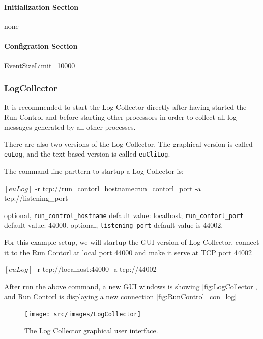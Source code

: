 \paragraph{Initialization Section}
none

\paragraph{Configration Section}
\begin{listing}[conf]
[RunControl]
EventSizeLimit=10000
\end{listing}

\subsubsection{LogCollector}
\label{sec:logcollector}
It is recommended to start the Log Collector directly after having started the Run Control and before starting other processors in order to collect all log messages generated by all other processes.

There are also two versions of the Log Collector.
The graphical version is called \texttt{euLog},
and the text-based version is called \texttt{euCliLog}.

The command line parttern to startup a Log Collector is:
\begin{listing}[mybash]
$[euLog]$ -r tcp://{run_contorl_hostname}:{run_contorl_port} -a tcp://{listening_port}
\end{listing}

\begin{description}
optional, \texttt{run\_control\_hostname} default value: localhost;  \texttt{run\_contorl\_port}  default value: 44000.
optional, \texttt{listening\_port} default value is 44002.
\end{description}

For this example setup, we will startup the GUI version of Log Collector, connect it to the Run Contorl at local port 44000 and make it serve at TCP port 44002\\
\begin{listing}[mybash]
$[euLog]$ -r tcp://localhost:44000 -a tcp://44002
\end{listing}

After run the above command, a new GUI windows is showing \autoref{fig:LogCollector}, and Run Contorl is displaying a new connection \autoref{fig:RunControl_con_log}
\begin{figure}[htb]
  \begin{center}
    \texttt{[image: src/images/LogCollector]}
    \caption{The Log Collector graphical user interface.}
    \label{fig:LogCollector}
  \end{center}
\end{figure}


